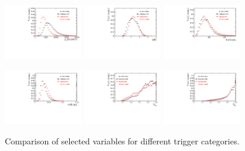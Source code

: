 \begin{figure}[h]
\centering
\includegraphics[height=!,width=0.3\textwidth]{figs/dataVsMC/trigger_norm/Ds2all_Bs_PT.pdf}
\includegraphics[height=!,width=0.3\textwidth]{figs/dataVsMC/trigger_norm/Ds2all_Bs_ETA.pdf}
\includegraphics[height=!,width=0.3\textwidth]{figs/dataVsMC/trigger_norm/Ds2all_NTracks.pdf}


\includegraphics[height=!,width=0.3\textwidth]{figs/dataVsMC/trigger_norm/Ds2all_Bs_DTF_TAUERR.pdf}
\includegraphics[height=!,width=0.3\textwidth]{figs/dataVsMC/trigger_norm/Ds2all_Bs_TAGOMEGA_OS.pdf}
\includegraphics[height=!,width=0.3\textwidth]{figs/dataVsMC/trigger_norm/Ds2all_Bs_SS_nnetKaon_PROB.pdf}


\caption{Comparison of selected variables for different trigger categories.}
\label{fig:}
\end{figure}

